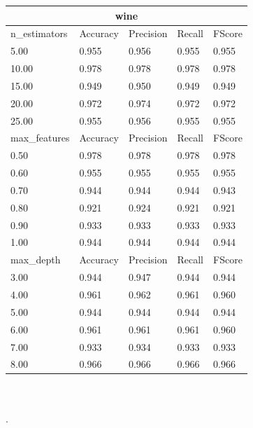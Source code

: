 \documentclass[12pt,a4paper]{article}
\begin{document}
\begin{tabular}{ |p{3cm}||p{2cm}|p{2cm}|p{2cm}|p{2cm}| }
\hline
\multicolumn{5}{|c|}{wine}\\
\hline
n\_estimators & Accuracy & Precision & Recall & FScore \\
\hline
5.00 & 0.955 & 0.956 & 0.955 & 0.955\\
10.00 & 0.978 & 0.978 & 0.978 & 0.978\\
15.00 & 0.949 & 0.950 & 0.949 & 0.949\\
20.00 & 0.972 & 0.974 & 0.972 & 0.972\\
25.00 & 0.955 & 0.956 & 0.955 & 0.955\\
\hline
max\_features & Accuracy & Precision & Recall & FScore \\
\hline
0.50 & 0.978 & 0.978 & 0.978 & 0.978\\
0.60 & 0.955 & 0.955 & 0.955 & 0.955\\
0.70 & 0.944 & 0.944 & 0.944 & 0.943\\
0.80 & 0.921 & 0.924 & 0.921 & 0.921\\
0.90 & 0.933 & 0.933 & 0.933 & 0.933\\
1.00 & 0.944 & 0.944 & 0.944 & 0.944\\
\hline
max\_depth & Accuracy & Precision & Recall & FScore \\
\hline
3.00 & 0.944 & 0.947 & 0.944 & 0.944\\
4.00 & 0.961 & 0.962 & 0.961 & 0.960\\
5.00 & 0.944 & 0.944 & 0.944 & 0.944\\
6.00 & 0.961 & 0.961 & 0.961 & 0.960\\
7.00 & 0.933 & 0.934 & 0.933 & 0.933\\
8.00 & 0.966 & 0.966 & 0.966 & 0.966\\
\hline
\end{tabular}
\\
\\.
\end{document}
